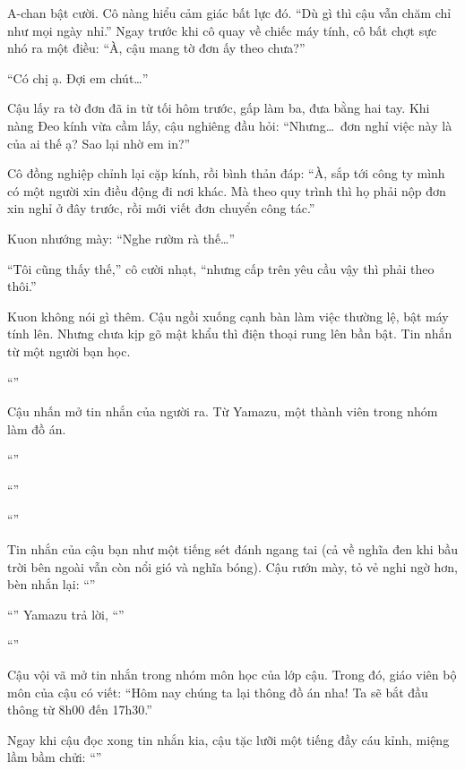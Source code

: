 \documentclass[../main.tex]{subfiles}
\begin{document}
A-chan bật cười. Cô nàng hiểu cảm giác bất lực đó. ``Dù gì thì cậu vẫn chăm chỉ như mọi ngày nhỉ.'' Ngay trước khi cô quay về chiếc máy tính, cô bất chợt sực nhó ra một điều: ``À, cậu mang tờ đơn ấy theo chưa?''

``Có chị ạ. Đợi em chút\dots''

Cậu lấy ra tờ đơn đã in từ tối hôm trước, gấp làm ba, đưa bằng hai tay. Khi nàng Đeo kính vừa cầm lấy, cậu nghiêng đầu hỏi: ``Nhưng\dots\ đơn nghỉ việc này là của ai thế ạ? Sao lại nhờ em in?''

Cô đồng nghiệp chỉnh lại cặp kính, rồi bình thản đáp: ``À, sắp tới công ty mình có một người xin điều động đi nơi khác. Mà theo quy trình thì họ phải nộp đơn xin nghỉ ở đây trước, rồi mới viết đơn chuyển công tác.''

Kuon nhướng mày: ``Nghe rườm rà thế\dots''

``Tôi cũng thấy thế,'' cô cười nhạt, ``nhưng cấp trên yêu cầu vậy thì phải theo thôi.''

Kuon không nói gì thêm. Cậu ngồi xuống cạnh bàn làm việc thường lệ, bật máy tính lên. Nhưng chưa kịp gõ mật khẩu thì điện thoại rung lên bần bật. Tin nhắn từ một người bạn học.

``''

Cậu nhấn mở tin nhắn của người ra. Từ Yamazu, một thành viên trong nhóm làm đồ án.

``''

``''

``''

Tin nhắn của cậu bạn như một tiếng sét đánh ngang tai (cả về nghĩa đen khi bầu trời bên ngoài vẫn còn nổi gió và nghĩa bóng). Cậu rướn mày, tỏ vẻ nghi ngờ hơn, bèn nhắn lại: ``''

``'' Yamazu trả lời, ``''

``''

Cậu vội vã mở tin nhắn trong nhóm môn học của lớp cậu. Trong đó, giáo viên bộ môn của cậu có viết: ``Hôm nay chúng ta lại thông đồ án nha! Ta sẽ bắt đầu thông từ 8h00 đến 17h30.''

Ngay khi cậu đọc xong tin nhắn kia, cậu tặc lưỡi một tiếng đầy cáu kỉnh, miệng lầm bầm chửi: ``''
\end{document}
